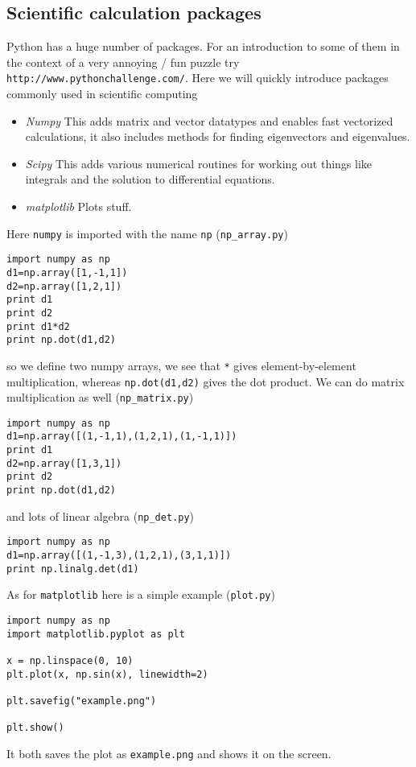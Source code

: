 \documentclass[11pt,a4paper]{scrartcl}
\begin{document}
\subsection*{Scientific calculation packages}

Python has a huge number of packages. For an introduction to some of
them in the context of a very annoying / fun puzzle try
\texttt{http://www.pythonchallenge.com/}. Here we will quickly
introduce packages commonly used in scientific computing 
\begin{itemize}
\item \textsl{Numpy} This adds matrix and vector datatypes and enables
  fast vectorized calculations, it also includes methods for finding
  eigenvectors and eigenvalues.
\item \textsl{Scipy} This adds various numerical routines for working out things like integrals and the solution to differential equations.
\item \textsl{matplotlib} Plots stuff.
\end{itemize}

Here \texttt{numpy} is imported with the name \texttt{np}  (\texttt{np\_array.py})
\begin{lstlisting}[numbers=right]
import numpy as np
d1=np.array([1,-1,1])
d2=np.array([1,2,1])
print d1
print d2
print d1*d2
print np.dot(d1,d2)
\end{lstlisting}
so we define two numpy arrays, we see that \texttt{*} gives element-by-element multiplication, whereas \texttt{np.dot(d1,d2)} gives the dot product. We can do matrix multiplication as well  (\texttt{np\_matrix.py})
\begin{lstlisting}[numbers=right]
import numpy as np
d1=np.array([(1,-1,1),(1,2,1),(1,-1,1)])
print d1
d2=np.array([1,3,1])
print d2
print np.dot(d1,d2)
\end{lstlisting}
and lots of linear algebra  (\texttt{np\_det.py})
\begin{lstlisting}[numbers=right]
import numpy as np
d1=np.array([(1,-1,3),(1,2,1),(3,1,1)])
print np.linalg.det(d1)
\end{lstlisting}

As for \texttt{matplotlib} here is a simple example  (\texttt{plot.py})
\begin{lstlisting}[numbers=right]
import numpy as np
import matplotlib.pyplot as plt

x = np.linspace(0, 10)
plt.plot(x, np.sin(x), linewidth=2)

plt.savefig("example.png")

plt.show()
\end{lstlisting}
It both saves the plot as \texttt{example.png} and shows it on the screen.
\end{document}

